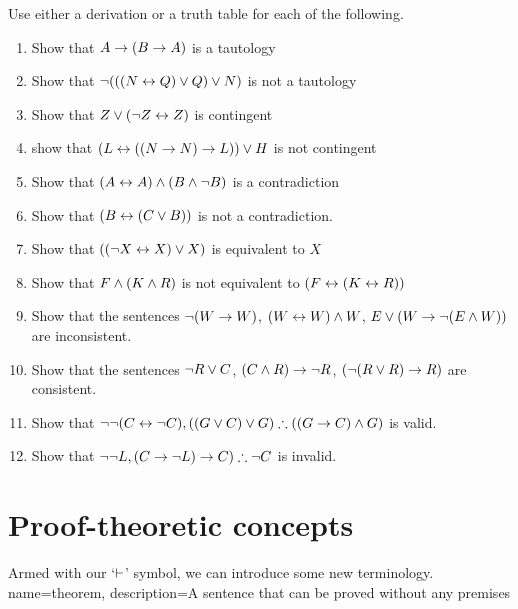 \begin{practiceproblems}
\noindent\problempart Use either a derivation or a truth table for each of the following.
\begin{enumerate}%
\item Show that $A \rightarrow (B \rightarrow A)$ is a tautology
\item Show that $\neg (((N \leftrightarrow Q) \vee Q) \vee N)$ is not a tautology
\item Show that $ Z \vee (\neg Z \leftrightarrow Z) $ is contingent
\item show that $ (L \leftrightarrow ((N \rightarrow N) \rightarrow L)) \vee H $ is not contingent
\item Show that $ (A \leftrightarrow A) \mathbin{\wedge} (B \mathbin{\wedge} \neg B)$ is a contradiction
\item Show that $ (B \leftrightarrow (C \vee B)) $ is not a contradiction.
\item Show that $ ((\neg X \leftrightarrow X) \vee X) $ is equivalent to $X$
\item Show that $F \mathbin{\wedge} (K \mathbin{\wedge} R) $ is not equivalent to $ (F \leftrightarrow (K \leftrightarrow R)) $
\item Show that the sentences $ \neg (W \rightarrow W)$, $(W \leftrightarrow W) \mathbin{\wedge} W$, $E \vee (W \rightarrow \neg (E \mathbin{\wedge} W))$ are inconsistent.
\item Show that the sentences  $\neg R \vee C $, $(C \mathbin{\wedge} R) \rightarrow \neg R$, $(\neg (R \vee R) \rightarrow R) $ are consistent.
\item Show that $\enot \enot (C \eiff \enot C), ((G \eor C) \eor G) \therefore ((G \eif C) \eand G) $ is valid.
\item Show that $ \enot \enot L,  (C \eif \enot L) \eif C) \therefore \enot C$ is invalid.
\end{enumerate}
\end{practiceproblems}


\chapter{Proof-theoretic concepts}\label{s:ProofTheoreticConcepts}
\nonexaminable


Armed with our `$\vdash$' symbol, we can introduce some new terminology.
{
name=theorem,
description={A sentence that can be proved without any premises}
}

